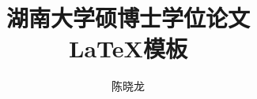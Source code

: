 \documentclass[doctor]{hnuthesis}
\title{湖南大学硕博士学位论文\\ \LaTeX{}模板} %
\author{陈晓龙}
\begin{document}
\maketitle


\tableofcontents
\begingroup
	\renewcommand*{\addvspace}[1]{}
	\newcommand{\loflabel}{图} 
	\renewcommand{\numberline}[1]{\loflabel~#1\hspace*{1em}}	
	\listoffigures
	
	\newcommand{\lotlabel}{表}
	\renewcommand{\numberline}[1]{\lotlabel~#1\hspace*{1em}}
	\listoftables
\endgroup


\mainmatter
%





\appendix



\backmatter

\end{document}
